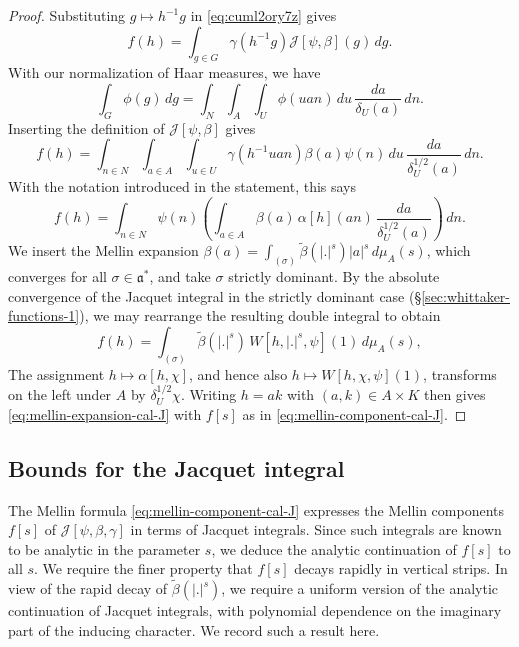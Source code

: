 \begin{proof}
  Substituting $g \mapsto h^{-1} g$ in \eqref{eq:cuml2ory7z} gives
  \begin{equation*}
    f(h) = \int_{g \in G} \gamma(h^{-1} g)\mathcal{J}[\psi,\beta](g)\,d g.
  \end{equation*}
  With our normalization of Haar measures, we have
  \begin{equation*}
    \int_{G} \phi (g) \,d g
    =
    \int_N \int_A \int_U \phi (u a n ) \, d u \, \frac{d a}{ \delta_U(a)} \, d n.
  \end{equation*}
  Inserting the definition of $\mathcal{J}[\psi,\beta]$ gives
  \begin{equation*}
    f(h) =
    \int_{n \in N}
    \int_{a \in A}
    \int_{u \in U}
    \gamma(h^{-1} u a n)
    \beta(a) \psi(n)
    \, d u \, \frac{d a}{\delta_U^{1/2}(a)} \, d n.
  \end{equation*}
  With the notation introduced in the statement, this says
  \begin{equation}\label{eq:fh-int-a-n}
    f(h)
    =
    \int_{n \in N} \psi(n)
    \left(
      \int_{a \in A}
      \beta(a)\,\alpha[h](a n)\,\frac{d a}{\delta_U^{1/2}(a)}
    \right)\,d n.
  \end{equation}
  We insert the Mellin expansion $\beta(a)=\int_{(\sigma)} \tilde{\beta}(|.|^s)|a|^s\,d\mu_A(s)$, which converges for all $\sigma \in \mathfrak{a}^*$, and take $\sigma$ strictly dominant.  By the absolute convergence of the Jacquet integral in the strictly dominant case (\S\ref{sec:whittaker-functions-1}), we may rearrange the resulting double integral to obtain
  \begin{equation*}
    f(h)
    =
    \int_{(\sigma)} \tilde{\beta}(|.|^s)\,W[h,|.|^s,\psi](1)\,d\mu_A(s),
  \end{equation*}
  The assignment $h \mapsto \alpha[h, \chi]$, and hence also $h \mapsto W[h,\chi,\psi](1)$, transforms on the left under $A$ by $\delta_U^{1/2}\chi$.  Writing $h = a k$ with $(a,k) \in A \times K$ then gives \eqref{eq:mellin-expansion-cal-J} with $f[s]$ as in \eqref{eq:mellin-component-cal-J}.
\end{proof}

\subsection{Bounds for the Jacquet integral}\label{sec:analyt-cont-jacq}
The Mellin formula \eqref{eq:mellin-component-cal-J} expresses the Mellin components $f[s]$ of $\mathcal{J}[\psi,\beta,\gamma]$ in terms of Jacquet integrals.  Since such integrals are known to be analytic in the parameter $s$, we deduce the analytic continuation of $f[s]$ to all $s$.  We require the finer property that $f[s]$ decays rapidly in vertical strips.  In view of the rapid decay of $\tilde{\beta}(\lvert . \rvert^s)$, we require a uniform version of the analytic continuation of Jacquet integrals, with polynomial dependence on the imaginary part of the inducing character.  We record such a result here.

